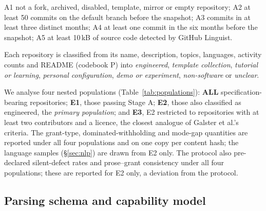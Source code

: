 \begin{description}\itemsep1pt
  \item[Stage A (metadata)] A1 not a fork, archived, disabled, template, mirror or empty repository; A2 at least 50
        commits on the default branch before the snapshot; A3 commits in at least three distinct months; A4 at least
        one commit in the six months before the snapshot; A5 at least 10\,kB of source code detected by GitHub Linguist.
  \item[Stage B (README classification)] Each repository is classified from its name, description, topics, languages,
        activity counts and README (codebook P) into \emph{engineered}, \emph{template collection}, \emph{tutorial or
        learning}, \emph{personal configuration}, \emph{demo or experiment}, \emph{non-software} or \emph{unclear}.
\end{description}

We analyse four nested populations (Table~\ref{tab:populations}): \textbf{ALL} specification-bearing repositories;
\textbf{E1}, those passing Stage A; \textbf{E2}, those also classified as engineered, the \emph{primary population};
and \textbf{E3}, E2 restricted to repositories with at least two contributors and a licence, the closest analogue of
Galster et al.'s criteria. The grant-type, dominated-withholding and mode-gap quantities are reported under all four
populations and on one copy per content hash; the language samples (\S\ref{sec:nlp}) are drawn from E2 only. The
protocol also pre-declared silent-defect rates and prose--grant consistency under all four populations; these are
reported for E2 only, a deviation from the protocol.




\subsection{Parsing schema and capability model}
\label{sec:parsing}
\label{sec:capmodel}

